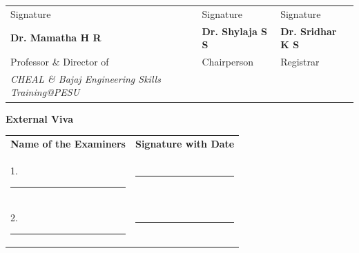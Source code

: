 \vspace{4mm}
\singlespacing
\centering
{\fontsize{12}{15}\selectfont
\begin{tabular}{@{}C{5.3cm}C{5.3cm}C{5.3cm}@{}}
Signature & Signature & Signature\\[1mm]
\textbf{Dr. Mamatha H R} & \textbf{Dr. Shylaja S S} & \textbf{Dr. Sridhar K S}\\
Professor \& Director of & Chairperson & Registrar\\
{\itshape\small CHEAL \& Bajaj Engineering Skills Training@PESU} & & \\
\end{tabular}\par}
\vspace{3mm}
{\bfseries\fontsize{12}{15}\selectfont External Viva\par}
\vspace{1mm}
{\fontsize{12}{15}\selectfont
\begin{tabular}{@{}L{7.4cm}L{7.4cm}@{}}
\textbf{Name of the Examiners} & \textbf{Signature with Date}\\[2mm]
1. \rule{5.8cm}{0.4pt} & \rule{5.8cm}{0.4pt}\\[4mm]
2. \rule{5.8cm}{0.4pt} & \rule{5.8cm}{0.4pt}\\
\end{tabular}\par}
\endgroup
\clearpage
